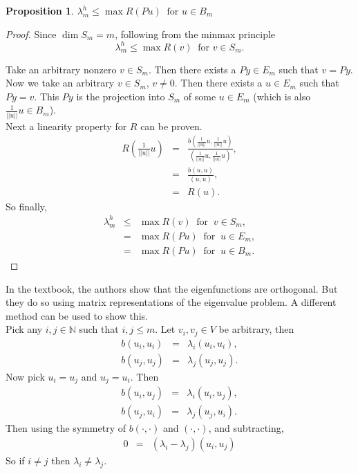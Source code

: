 \documentclass[../../main.tex]{subfiles}
\begin{document}
\newtheorem{Prop_2}[Prop_1]{Proposition} \label{Prop_2}
\begin{Prop_2}
	$\lambda^{h}_{m} \leq \max R(Pu) \ \text{ for } u \in B_{m}$\\
\end{Prop_2}
\begin{proof}
	Since $\dim S_{m} = m$, following from the minmax principle
	\begin{equation*}
		\lambda_m^h \leq \max R(v) \ \text{ for } v \in S_m.
	\end{equation*}

	Take an arbitrary nonzero $v \in S_m$. Then there exists a $Py \in E_m$ such that $v = Py$.\\
 
	Now we take an arbitrary $v \in S_{m}$, $v \neq 0$. Then there exists a $u \in E_{m}$ such that $Py = v$. This $Py$ is the projection into $S_m$ of some $u \in E_m$ (which is also $\displaystyle \frac{1}{||u||}u \in B_m$).\\
	
	Next a linearity property for $R$ can be proven. 
	\begin{eqnarray*}
	R(\frac{1}{||u||}u) &=& \frac{b\left(\frac{1}{||u||}u,\frac{1}{||u||}u\right)}{\left(\frac{1}{||u||}u,\frac{1}{||u||}u\right)},\\
						&=& \frac{b(u,u)}{(u,u)},\\
						&=& R(u).
	\end{eqnarray*}
	So finally,
	\begin{eqnarray*}
	\lambda_{m}^{h} &\leq & \max R(v) \ \text{ for } \ v \in S_{m},\\
						&=& \max R(Pu) \ \text{ for } \ u \in E_{m},\\
						&=& \max R(Pu) \ \text{ for } \ u \in B_{m}.
	\end{eqnarray*}
\end{proof}

In the textbook, the authors show that the eigenfunctions are orthogonal. But they do so using matrix representations of the eigenvalue problem. A different method can be used to show this.\\

Pick any $i,j \in \mathbb{N}$ such that $i,j \leq m$. Let $v_{i},v_{j} \in V$ be arbitrary, then
\begin{eqnarray*}
	b(u_{i},u_{i}) &=& \lambda_{i}( u_{i},u_{i}),\\
	b(u_{j},u_{j}) &=& \lambda_{j}( u_{j},u_{j}).
\end{eqnarray*}
Now pick $u_{i} = u_{j}$ and $u_{j} = u_{i}$. Then
\begin{eqnarray*}
	b(u_{i},u_{j}) &=& \lambda_{i}( u_{i},u_{j}),\\
	b(u_{j},u_{i}) &=& \lambda_{j}( u_{j},u_{i}).
\end{eqnarray*}
Then using the symmetry of $b(\cdot,\cdot)$ and $( \cdot, \cdot )$, and subtracting,
\begin{eqnarray*}
	0 &=& (\lambda_{i} - \lambda_{j})( u_{i}, u_{j} )
\end{eqnarray*}
So if $i \neq j$ then $\lambda_{i} \neq \lambda_{j}$.\\
\end{document}
